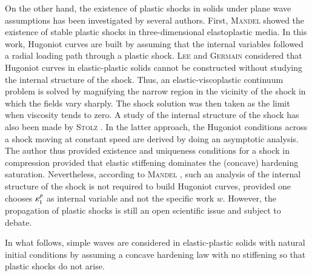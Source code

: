 On the other hand, the existence of plastic shocks in solids under plane wave assumptions has been investigated by several authors. 
First, \textsc{Mandel} \cite{Mandel1} showed the existence of stable plastic shocks in three-dimensional elastoplastic media.
In this work, Hugoniot curves are built by assuming that the internal variables followed a radial loading path through a plastic shock.
\textsc{Lee} and \textsc{Germain} \cite{Germain_shock} considered that Hugoniot curves in elastic-plastic solids cannot be constructed without studying the internal structure of the shock.
Thus, an elastic-viscoplastic continuum problem is solved by magnifying the narrow region in the vicinity of the shock in which the fields vary sharply.
The shock solution was then taken as the limit when viscosity tends to zero.
A study of the internal structure of the shock has also been made by \textsc{Stolz} \cite{Claude}.
In the latter approach, the Hugoniot conditions across a shock moving at constant speed are derived by doing an asymptotic analysis. 
The author thus provided existence and uniqueness conditions for a shock in compression provided that elastic stiffening dominates the (concave) hardening saturation.
Nevertheless, according to \textsc{Mandel} \cite{Mandel2}, such an analysis of the internal structure of the shock is not required to build Hugoniot curves, provided one chooses $\varepsilon^p_1$ as internal variable and not the specific work $w$.
However, the propagation of plastic shocks is still an open scientific issue and subject to debate.

In what follows, simple waves are considered in elastic-plastic solids with natural initial conditions by assuming a concave hardening law with no stiffening so that plastic shocks do not arise.




